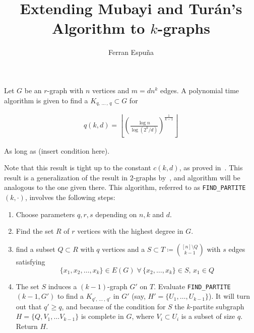 \documentclass[12pt]{article}
\author{Ferran Espuña}
\date{} %
\begin{document}
    \title{Extending Mubayi and Turán's Algorithm to $k$-graphs}

    \maketitle

    Let $G$ be an $r$-graph with $n$ vertices and $m = dn^k$ edges.
    A polynomial time algorithm is given to find a $K_{q,\, \ldots\, ,\, q} \subset G$ for

    \begin{align*}
        q (k, d) = \left\lfloor \left(  \frac{\log n}{\log (2^k/d)} \right)^{\frac{1}{k-1}} \right\rfloor
        \label{eq:q}
    \end{align*}

    As long as (insert condition here). %
    
    Note that this result is tight up to the constant $c(k, d)$,
    as proved in~\cite{Erods1964}.
    This result is a generalization of the result in $2$-graphs by~\cite{MUBAYI2010174},
    and algorithm will be analogous to the one given there.
    This algorithm, referred to as \verb|FIND_PARTITE|$(k, \cdot)$, involves the following steps:

    \begin{enumerate}
        \item Choose parameters $q, r, s$ depending on $n, k$ and $d$. \label{step:choose_parameters}

        \item Find the set $R$ of $r$ vertices with the highest degree in $G$. \label{step:find_R}

        \item find a subset $Q \subset R$ with $q$ vertices and a
        $S \subset T \coloneqq \binom{[n] \setminus Q}{k-1}$ with $s$ edges satisfying
        \[\{x_1, x_2, \ldots, x_k\} \in E(G) \; \forall \, \{x_2, \ldots, x_k\} \in S, \, x_1 \in Q\] \label{step:find_Q_S}

        \item The set $S$ induces a $(k-1)$-graph $G'$ on $T$.
        Evaluate \verb|FIND_PARTITE|$(k-1, G')$ to find a $K_{q',\, \ldots\, ,\, q'}$ in $G'$
        (say, $H' = \{U_1, \ldots, U_{k-1}\}$). It will turn out that $q' \geq q$,
        and because of the condition for $S$ the $k$-partite subgraph $H = \{Q, V_1, \ldots V_{k-1}\}$
        is complete in $G$, where $V_i \subset U_i$ is a subset of size $q$.
        Return $H$.

    \end{enumerate}
\end{document}
